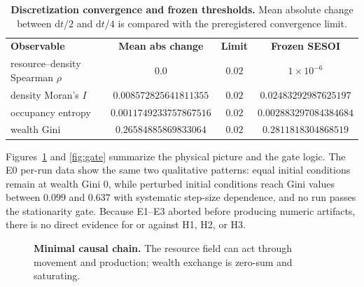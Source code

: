 \documentclass[aps,prl,reprint,superscriptaddress,amsmath,amssymb]{revtex4-2}
\begin{document}
\begin{table}[htbp]
\caption{\textbf{Discretization convergence and frozen thresholds.} Mean absolute change between $\mathrm{d}t/2$ and $\mathrm{d}t/4$ is compared with the preregistered convergence limit.}
\label{tab:dt}
\begin{ruledtabular}
\begin{tabular}{lccc}
\textbf{Observable} & \textbf{Mean abs change} & \textbf{Limit} & \textbf{Frozen SESOI}\\
resource--density Spearman $\rho$ & $0.0$ & $0.02$ & $1\times10^{-6}$\\
density Moran's $I$ & $0.008572825641811355$ & $0.02$ & $0.02483292987625197$\\
occupancy entropy & $0.0011749233757867516$ & $0.02$ & $0.002883297084384684$\\
wealth Gini & $0.26584885869833064$ & $0.02$ & $0.2811818304868519$\\
\end{tabular}
\end{ruledtabular}
\end{table}

Figures~\ref{fig:model} and \ref{fig:gate} summarize the physical picture and the gate logic. The E0 per-run data show the same two qualitative patterns: equal initial conditions remain at wealth Gini $0$, while perturbed initial conditions reach Gini values between $0.099$ and $0.637$ with systematic step-size dependence, and no run passes the stationarity gate. Because E1--E3 aborted before producing numeric artifacts, there is no direct evidence for or against H1, H2, or H3.

\begin{figure}[htbp]
\centering
{}
\caption{\textbf{Minimal causal chain.} The resource field can act through movement and production; wealth exchange is zero-sum and saturating.}
\label{fig:model}
\end{figure}
\end{document}
